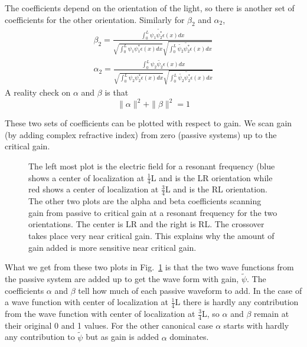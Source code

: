 The coefficients depend on the orientation of the light, so there is another set of coefficients for the other orientation. Similarly for $ \beta _2 $ and $ \alpha _2 $,
\begin{equation}  %
\begin{gathered}
\beta _2 = \frac{\int _0 ^L \psi _1 \tilde{\psi _2 ^*} \epsilon(x) dx}
{\sqrt{\int _0 ^L \psi _1 \psi _1 ^* \epsilon(x) dx}
 \sqrt{\int _0 ^L \tilde{\psi _2} \tilde{\psi _2 ^*} \epsilon(x) dx}} \\
\alpha _2 = \frac{\int _0 ^L \psi _2 \tilde{\psi _2} \epsilon(x) dx}
{\sqrt{\int _0 ^L \psi _2 \psi _2 ^* \epsilon(x) dx}
 \sqrt{\int _0 ^L \tilde{\psi _2} \tilde{\psi _2 ^*} \epsilon(x) dx}}
\end{gathered}
\end{equation}
A reality check on $\alpha$ and $\beta$ is that
\begin{equation}
\| \alpha \| ^2 + \| \beta \| ^2= 1
\end{equation}

These two sets of coefficients can be plotted with respect to gain. We scan gain (by adding complex refractive index) from zero (passive systems) up to the critical gain. 
\begin{figure}
\vskip -0.5cm
\centerline{
}
\vskip -0.5cm
\caption[The left most plot is the electric field for a resonant frequency (blue shows a center of localization at $ \frac{1}{4} $L and is the LR orientation while red shows a center of localization at $ \frac{3}{4} $L and is the RL orientation.]{The left most plot is the electric field for a resonant frequency (blue shows a center of localization at $ \frac{1}{4} $L and is the LR orientation while red shows a center of localization at $ \frac{3}{4} $L and is the RL orientation. The other two plots are the alpha and beta coefficients scanning gain from  passive to critical gain at a resonant frequency for the two orientations. The center is LR and the right is RL. The crossover takes place very near critical gain. This explains why the amount of gain added is more sensitive near critical gain.}
\label{fig:alphabeta}
\end{figure}

What we get from these two plots in Fig.~\ref{fig:alphabeta} is that the two wave functions from the passive system are added up to get the wave form with gain, $ \tilde{\psi}$. The coefficients $\alpha$ and $\beta$ tell how much of each passive waveform to add. In the case of a wave function with center of localization at $ \frac{1}{4} $L there is hardly any contribution from the wave function with center of localization at $ \frac{3}{4} $L, so $\alpha$ and $\beta$ remain at their original 0 and 1 values. For the other canonical case $\alpha$ starts with hardly any contribution to $ \tilde{\psi}$ but as gain is added $\alpha$ dominates.

